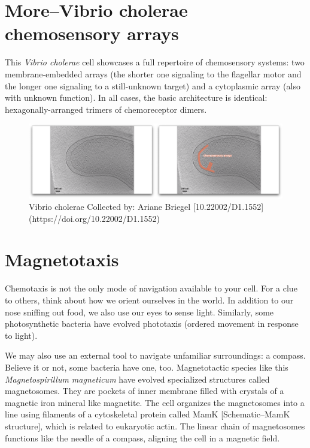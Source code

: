 \documentclass[]{tufte-book}
\begin{document}
\hypertarget{morevibrio-cholerae-chemosensory-arrays}{\section{More--Vibrio
cholerae chemosensory
arrays}\label{morevibrio-cholerae-chemosensory-arrays}}

This \emph{Vibrio cholerae} cell showcases a full repertoire of
chemosensory systems: two membrane-embedded arrays (the shorter one
signaling to the flagellar motor and the longer one signaling to a
still-unknown target) and a cytoplasmic array (also with unknown
function). In all cases, the basic architecture is identical:
hexagonally-arranged trimers of chemoreceptor dimers.

\begin{figure}
\includegraphics{movie_stills/7_5a} \caption[Vibrio cholerae Collected by]{Vibrio cholerae Collected by: Ariane Briegel [10.22002/D1.1552](https://doi.org/10.22002/D1.1552)}\label{fig:unnamed-chunk-130}
\end{figure}

\section{Magnetotaxis}\label{magnetotaxis}

Chemotaxis is not the only mode of navigation available to your cell.
For a clue to others, think about how we orient ourselves in the world.
In addition to our nose sniffing out food, we also use our eyes to sense
light. Similarly, some photosynthetic bacteria have evolved phototaxis
(ordered movement in response to light).

We may also use an external tool to navigate unfamiliar surroundings: a
compass. Believe it or not, some bacteria have one, too. Magnetotactic
species like this \emph{Magnetospirillum magneticum} have evolved
specialized structures called magnetosomes. They are pockets of inner
membrane filled with crystals of a magnetic iron mineral like magnetite.
The cell organizes the magnetosomes into a line using filaments of a
cytoskeletal protein called MamK {[}Schematic--MamK structure{]}, which
is related to eukaryotic actin. The linear chain of magnetosomes
functions like the needle of a compass, aligning the cell in a magnetic
field.
\end{document}
